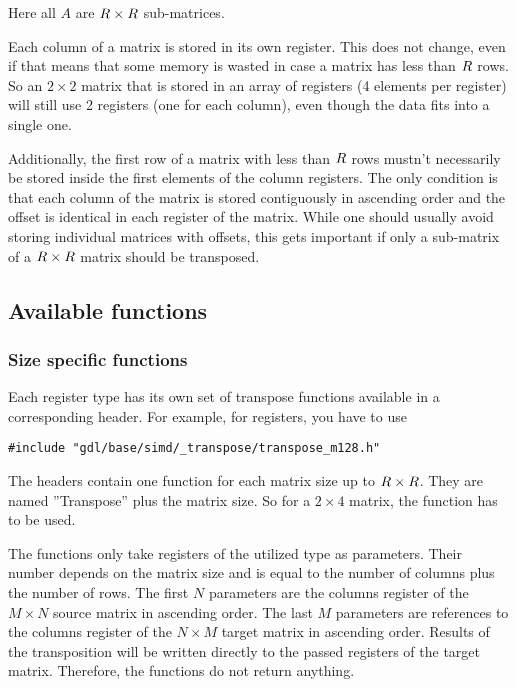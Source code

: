 \noindent Here all $A$ are $R \times R$ sub-matrices.


Each column of a matrix is stored in its own register.
This does not change, even if that means that some memory is wasted in case a matrix has less than $R$ rows.
So an $2 \times 2$ matrix that is stored in an array of  registers (4 elements per register) will still use 2 registers (one for each column), even though the data fits into a single one.

Additionally, the first row of a matrix with less than $R$ rows mustn't necessarily be stored inside the first elements of the column registers. 
The only condition is that each column of the matrix is stored contiguously in ascending order and the offset is identical in each register of the matrix.
While one should usually avoid storing individual matrices with offsets, this gets important if only a sub-matrix of a $R \times R$ matrix should be transposed.
 

\subsection{Available functions}

\subsubsection{Size specific functions}

Each register type has its own set of transpose functions available in a corresponding header.
For example, for  registers, you have to use
\begin{verbatim}
#include "gdl/base/simd/_transpose/transpose_m128.h"
\end{verbatim}

The headers contain one function for each matrix size up to $R \times R$.
They are named ''Transpose'' plus the matrix size.
So for a $2 \times 4$ matrix, the function  has to be used.

The functions only take registers of the utilized type as parameters.
Their number depends on the matrix size and is equal to the number of columns plus the number of rows.
The first $N$ parameters are the columns register of the $M \times N$ source matrix in ascending order.
The last $M$ parameters are references to the columns register of the $N \times M$ target matrix in ascending order.
Results of the transposition will be written directly to the passed registers of the target matrix.
Therefore, the functions do not return anything.

